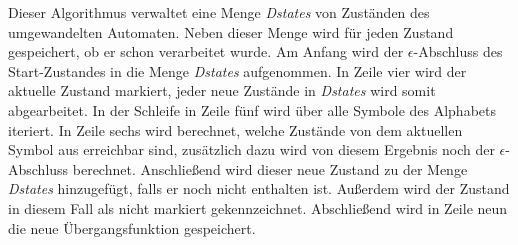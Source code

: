 Dieser Algorithmus verwaltet eine Menge \textit{Dstates} von Zuständen des
umgewandelten Automaten. Neben dieser Menge wird für jeden Zustand gespeichert,
ob er schon verarbeitet wurde. Am Anfang wird der $\epsilon$-Abschluss des
Start-Zustandes  in die Menge \textit{Dstates} aufgenommen. In Zeile
vier wird der aktuelle Zustand markiert, jeder neue Zustände in \textit{Dstates}
wird somit abgearbeitet. In der Schleife in Zeile fünf wird über alle Symbole des
Alphabets iteriert. In Zeile sechs wird berechnet, welche Zustände von dem
aktuellen Symbol aus erreichbar sind, zusätzlich dazu wird von diesem Ergebnis
noch der $\epsilon$-Abschluss berechnet. Anschließend wird dieser neue Zustand zu
der Menge \textit{Dstates} hinzugefügt, falls er noch nicht enthalten ist.
Außerdem wird der Zustand in diesem Fall als nicht markiert gekennzeichnet.
Abschließend wird in Zeile neun die neue Übergangsfunktion
gespeichert.\vspace{10pt}




